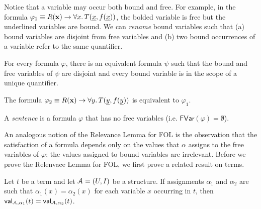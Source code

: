 \documentclass[11pt,usenames, dvipsnames]{article}
\begin{document}
Notice that a variable may occur both bound and free. For example, in the formula $\varphi_1 \equiv R(\mathbf{x}) \to \forall x \ldotp T(\underline{x}, f(\underline{x}))$, the bolded variable is free but the underlined variables are bound. We can \emph{rename} bound variables such that (a) bound variables are disjoint from free variables and (b) two bound occurrences of a variable refer to the same quantifier.

\begin{claim}
  For every formula $\varphi$, there is an equivalent formula $\psi$ such that the bound and free variables of $\psi$ are disjoint and every bound variable is in the scope of a unique quantifier.
\end{claim}

\begin{example}
  The formula $\varphi_2 \equiv R(\mathbf{x}) \to \forall y \ldotp T(\underline{y}, f(\underline{y}))$ is equivalent to $\varphi_1$.
\end{example}

\begin{definition}[Sentence]
  A \emph{sentence} is a formula $\varphi$ that has no free variables (i.e. $\mathsf{FVar}(\varphi) = \emptyset$).
\end{definition}

An analogous notion of the Relevance Lemma for FOL is the observation that the satisfaction of a formula depends only on the values that $\alpha$ assigns to the free variables of $\varphi$; the values assigned to bound variables are irrelevant. Before we prove the Relenvace Lemma for FOL, we first prove a related result on terms.

\begin{lemma}
  Let $t$ be a term and let $\struct = (U, I)$ be a structure. If assignments $\alpha_1$ and $\alpha_2$ are such that $\alpha_1(x) = \alpha_2(x)$ for each variable $x$ occurring in $t$, then $\val{\struct, \alpha_1}{t} = \val{\struct, \alpha_2}{t}$.
\end{lemma}
\end{document}
